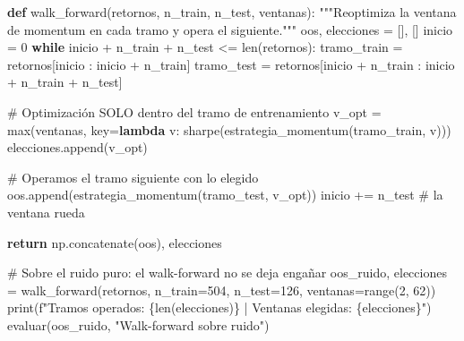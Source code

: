 \documentclass[
  spanish,
  letterpaper,
  DIV=11,
  numbers=noendperiod]{scrreprt}
\newenvironment{Shaded}{\begin{snugshade}}{\end{snugshade}}
\newcommand{\BuiltInTok}[1]{\textcolor[rgb]{0.00,0.23,0.31}{#1}}
\newcommand{\CommentTok}[1]{\textcolor[rgb]{0.37,0.37,0.37}{#1}}
\newcommand{\ControlFlowTok}[1]{\textcolor[rgb]{0.00,0.23,0.31}{\textbf{#1}}}
\newcommand{\DecValTok}[1]{\textcolor[rgb]{0.68,0.00,0.00}{#1}}
\newcommand{\KeywordTok}[1]{\textcolor[rgb]{0.00,0.23,0.31}{\textbf{#1}}}
\newcommand{\NormalTok}[1]{\textcolor[rgb]{0.00,0.23,0.31}{#1}}
\newcommand{\OperatorTok}[1]{\textcolor[rgb]{0.37,0.37,0.37}{#1}}
\newcommand{\SpecialCharTok}[1]{\textcolor[rgb]{0.37,0.37,0.37}{#1}}
\newcommand{\SpecialStringTok}[1]{\textcolor[rgb]{0.13,0.47,0.30}{#1}}
\newcommand{\StringTok}[1]{\textcolor[rgb]{0.13,0.47,0.30}{#1}}
\begin{document}
\label{walk-forward}
\begin{Shaded}
\begin{Highlighting}[]
\KeywordTok{def}\NormalTok{ walk\_forward(retornos, n\_train, n\_test, ventanas):}
    \CommentTok{"""Reoptimiza la ventana de momentum en cada tramo y opera el siguiente."""}
\NormalTok{    oos, elecciones }\OperatorTok{=}\NormalTok{ [], []}
\NormalTok{    inicio }\OperatorTok{=} \DecValTok{0}
    \ControlFlowTok{while}\NormalTok{ inicio }\OperatorTok{+}\NormalTok{ n\_train }\OperatorTok{+}\NormalTok{ n\_test }\OperatorTok{\textless{}=} \BuiltInTok{len}\NormalTok{(retornos):}
\NormalTok{        tramo\_train }\OperatorTok{=}\NormalTok{ retornos[inicio : inicio }\OperatorTok{+}\NormalTok{ n\_train]}
\NormalTok{        tramo\_test }\OperatorTok{=}\NormalTok{ retornos[inicio }\OperatorTok{+}\NormalTok{ n\_train : inicio }\OperatorTok{+}\NormalTok{ n\_train }\OperatorTok{+}\NormalTok{ n\_test]}

        \CommentTok{\# Optimización SOLO dentro del tramo de entrenamiento}
\NormalTok{        v\_opt }\OperatorTok{=} \BuiltInTok{max}\NormalTok{(ventanas, key}\OperatorTok{=}\KeywordTok{lambda}\NormalTok{ v: sharpe(estrategia\_momentum(tramo\_train, v)))}
\NormalTok{        elecciones.append(v\_opt)}

        \CommentTok{\# Operamos el tramo siguiente con lo elegido}
\NormalTok{        oos.append(estrategia\_momentum(tramo\_test, v\_opt))}
\NormalTok{        inicio }\OperatorTok{+=}\NormalTok{ n\_test    }\CommentTok{\# la ventana rueda}

    \ControlFlowTok{return}\NormalTok{ np.concatenate(oos), elecciones}

\CommentTok{\# Sobre el ruido puro: el walk{-}forward no se deja engañar}
\NormalTok{oos\_ruido, elecciones }\OperatorTok{=}\NormalTok{ walk\_forward(retornos, n\_train}\OperatorTok{=}\DecValTok{504}\NormalTok{, n\_test}\OperatorTok{=}\DecValTok{126}\NormalTok{,}
\NormalTok{                                     ventanas}\OperatorTok{=}\BuiltInTok{range}\NormalTok{(}\DecValTok{2}\NormalTok{, }\DecValTok{62}\NormalTok{))}
\BuiltInTok{print}\NormalTok{(}\SpecialStringTok{f"Tramos operados: }\SpecialCharTok{\{}\BuiltInTok{len}\NormalTok{(elecciones)}\SpecialCharTok{\}}\SpecialStringTok{ | Ventanas elegidas: }\SpecialCharTok{\{}\NormalTok{elecciones}\SpecialCharTok{\}}\SpecialStringTok{"}\NormalTok{)}
\NormalTok{evaluar(oos\_ruido, }\StringTok{"Walk{-}forward sobre ruido"}\NormalTok{)}
\end{Highlighting}
\end{Shaded}
\end{document}
